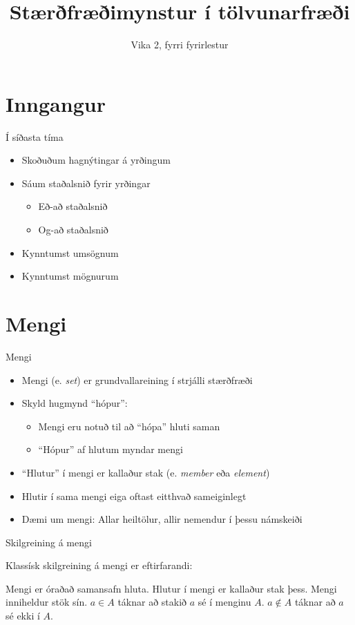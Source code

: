\documentclass[handout]{beamer}
\title{Stærðfræðimynstur í tölvunarfræði}
\subtitle{Vika 2, fyrri fyrirlestur}
\begin{document}
\begin{frame}
\titlepage
\end{frame}

\section{Inngangur}

\begin{frame}{Í síðasta tíma}
\begin{itemize}
 \item Skoðuðum hagnýtingar á yrðingum
 \item Sáum staðalsnið fyrir yrðingar
 \begin{itemize}
  \item Eð-að staðalsnið
  \item Og-að staðalsnið
 \end{itemize}
 \item Kynntumst umsögnum
 \item Kynntumst mögnurum
\end{itemize}
\end{frame}

\section{Mengi}

\begin{frame}{Mengi}
\begin{itemize}
 \item Mengi (e. \emph{set}) er grundvallareining í strjálli stærðfræði
 \item Skyld hugmynd ``hópur'':
 \begin{itemize}
  \item Mengi eru notuð til að ``hópa'' hluti saman
  \item ``Hópur'' af hlutum myndar mengi
 \end{itemize}
 \item ``Hlutur'' í mengi er kallaður stak (e. \emph{member} eða \emph{element})
 \item Hlutir í sama mengi eiga oftast eitthvað sameiginlegt
 \item Dæmi um mengi: Allar heiltölur, allir nemendur í þessu námskeiði
\end{itemize}
\end{frame}

\begin{frame}{Skilgreining á mengi}

Klassísk skilgreining á mengi er eftirfarandi:
\begin{tcolorbox}[title=Mengi]
Mengi er óraðað samansafn hluta. Hlutur í mengi er kallaður stak þess. Mengi inniheldur stök sín. $a \in A$ táknar að stakið $a$ sé í menginu $A$. $a \notin A$ táknar að $a$ sé ekki í $A$.
\end{tcolorbox}

\end{frame}
\end{document}
